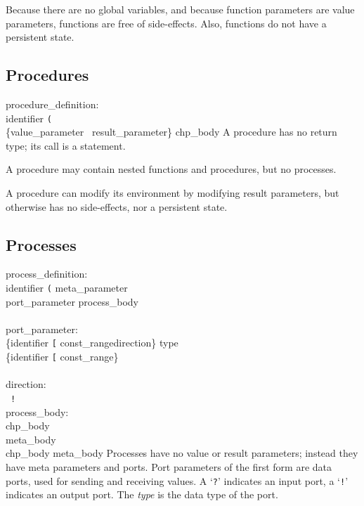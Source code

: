Because there are no global variables, and because function parameters
are value parameters, functions are free of side-effects. Also, functions
do not have a persistent state.


\subsection{Procedures}\label{sec:procedure}

\grammarstart
procedure\_definition: \\
       identifier {\tt{}(} \\
      \>\qquad\{value\_parameter \orbox \ result\_parameter\}\SEQOPT {\tt{})} chp\_body
\grammarend
A procedure has no return type; its call is a statement.

A procedure may contain nested functions and procedures, but no processes.

A procedure can modify its environment by modifying result parameters,
but otherwise has no side-effects, nor a persistent state.


\subsection{Processes}\label{sec:process}

\grammarstart
process\_definition: \\
       identifier {\tt{}(} meta\_parameter\SEQOPT {\tt{})} \\
      \>\qquad	{\tt{}(} port\_parameter\SEQOPT {\tt{})} process\_body \\
 \\
port\_parameter: \\
       \>\{identifier {\tt{}[} const\_range\LIST {\tt{}]}\OPT direction\}\LIST {\tt{}:} type \\
\orbox \>\{identifier {\tt{}[} const\_range\LIST {\tt{}]}\OPT \}\LIST \\
 \\
direction: \\
       \orbox \ {\tt{}!}
 \\
process\_body: \\
       \>chp\_body \\
\orbox \>meta\_body \\
\orbox \>chp\_body meta\_body
\grammarend
Processes have no value or result parameters; instead they have meta
parameters and ports.
Port parameters of the first form are data ports, used for sending and
receiving values. A `{\tt{}?}' indicates an input port, a `{\tt{}!}'
indicates an output port. The {\it{}type} is the data type of the port.

